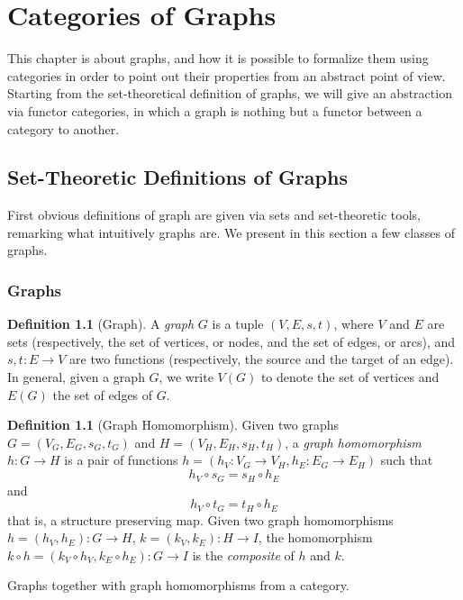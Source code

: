\documentclass[a4paper, twoside,openright]{report}
\theoremstyle{plain}
\theoremstyle{definition}
\newtheorem{definition}[theorem]{Definition}
\begin{document}
\chapter{Categories of Graphs}
This chapter is about graphs, and how it is possible to formalize them using categories in order to point out their properties from an abstract point of view. Starting from the set-theoretical definition of graphs, we will give an abstraction via functor categories, in which a graph is nothing but a functor between a category to another.

\section{Set-Theoretic Definitions of Graphs}

First obvious definitions of graph are given via sets and set-theoretic tools, remarking what intuitively graphs are. We present in this section a few classes of graphs.

\subsection{Graphs}

\begin{definition}[Graph]
    A \emph{graph} $G$ is a tuple $(V, E, s, t)$, where $V$ and $E$ are sets (respectively, the set of vertices, or nodes, and the set of edges, or arcs), and $s, t: E \rightarrow V$ are two functions (respectively, the source and the target of an edge).
    In general, given a graph $G$, we write $V(G)$ to denote the set of vertices and $E(G)$ the set of edges of $G$.
\end{definition}

\begin{definition}[Graph Homomorphism]\label{def:graph_hom}
    Given two graphs $G=(V_G, E_G, s_G, t_G)$ and $H=(V_H, E_H, s_H, t_H)$, a \emph{graph homomorphism} $h: G \rightarrow H$ is a pair of functions $h = (h_V: V_G \rightarrow V_H, h_E: E_G \rightarrow E_H)$ such that
    \[
        h_V \circ s_G = s_H \circ h_E
    \]
    and
    \[
        h_V \circ t_G = t_H \circ h_E
    \]
    that is, a structure preserving map.
    Given two graph homomorphisms $h = (h_V, h_E): G \rightarrow H$, $k = (k_V, k_E): H \rightarrow I$, the homomorphism $ k \circ h = (k_V \circ h_V, k_E \circ h_E): G \rightarrow I$ is the \emph{composite} of $h$ and $k$.
\end{definition}

Graphs together with graph homomorphisms from a category.
\end{document}
